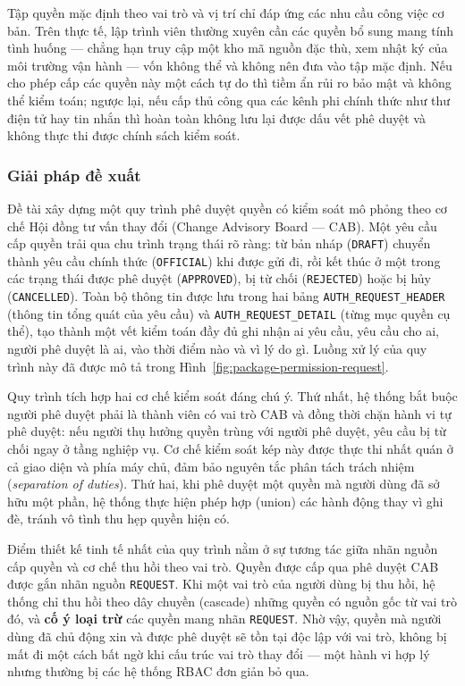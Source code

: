 \documentclass[../DoAn.tex]{subfiles}
\begin{document}
Tập quyền mặc định theo vai trò và vị trí chỉ đáp ứng các nhu cầu công việc cơ bản. Trên thực tế, lập trình viên thường xuyên cần các quyền bổ sung mang tính tình huống --- chẳng hạn truy cập một kho mã nguồn đặc thù, xem nhật ký của môi trường vận hành --- vốn không thể và không nên đưa vào tập mặc định. Nếu cho phép cấp các quyền này một cách tự do thì tiềm ẩn rủi ro bảo mật và không thể kiểm toán; ngược lại, nếu cấp thủ công qua các kênh phi chính thức như thư điện tử hay tin nhắn thì hoàn toàn không lưu lại được dấu vết phê duyệt và không thực thi được chính sách kiểm soát.

\subsubsection*{Giải pháp đề xuất}

Đề tài xây dựng một quy trình phê duyệt quyền có kiểm soát mô phỏng theo cơ chế Hội đồng tư vấn thay đổi (Change Advisory Board --- CAB). Một yêu cầu cấp quyền trải qua chu trình trạng thái rõ ràng: từ bản nháp (\texttt{DRAFT}) chuyển thành yêu cầu chính thức (\texttt{OFFICIAL}) khi được gửi đi, rồi kết thúc ở một trong các trạng thái được phê duyệt (\texttt{APPROVED}), bị từ chối (\texttt{REJECTED}) hoặc bị hủy (\texttt{CANCELLED}). Toàn bộ thông tin được lưu trong hai bảng \texttt{AUTH\_REQUEST\_HEADER} (thông tin tổng quát của yêu cầu) và \texttt{AUTH\_REQUEST\_DETAIL} (từng mục quyền cụ thể), tạo thành một vết kiểm toán đầy đủ ghi nhận ai yêu cầu, yêu cầu cho ai, người phê duyệt là ai, vào thời điểm nào và vì lý do gì. Luồng xử lý của quy trình này đã được mô tả trong Hình~\ref{fig:package-permission-request}.

Quy trình tích hợp hai cơ chế kiểm soát đáng chú ý. Thứ nhất, hệ thống bắt buộc người phê duyệt phải là thành viên có vai trò CAB và đồng thời chặn hành vi tự phê duyệt: nếu người thụ hưởng quyền trùng với người phê duyệt, yêu cầu bị từ chối ngay ở tầng nghiệp vụ. Cơ chế kiểm soát kép này được thực thi nhất quán ở cả giao diện và phía máy chủ, đảm bảo nguyên tắc phân tách trách nhiệm (\textit{separation of duties}). Thứ hai, khi phê duyệt một quyền mà người dùng đã sở hữu một phần, hệ thống thực hiện phép hợp (union) các hành động thay vì ghi đè, tránh vô tình thu hẹp quyền hiện có.

Điểm thiết kế tinh tế nhất của quy trình nằm ở sự tương tác giữa nhãn nguồn cấp quyền và cơ chế thu hồi theo vai trò. Quyền được cấp qua phê duyệt CAB được gắn nhãn nguồn \texttt{REQUEST}. Khi một vai trò của người dùng bị thu hồi, hệ thống chỉ thu hồi theo dây chuyền (cascade) những quyền có nguồn gốc từ vai trò đó, và \textbf{cố ý loại trừ} các quyền mang nhãn \texttt{REQUEST}. Nhờ vậy, quyền mà người dùng đã chủ động xin và được phê duyệt sẽ tồn tại độc lập với vai trò, không bị mất đi một cách bất ngờ khi cấu trúc vai trò thay đổi --- một hành vi hợp lý nhưng thường bị các hệ thống RBAC đơn giản bỏ qua.
\end{document}
